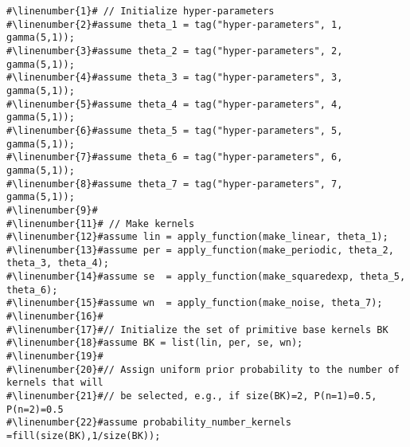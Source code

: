 \begin{mdframed}
\begin{minipage}{\linewidth}
\small
\belowcaptionskip=-10pt
\begin{lstlisting}[mathescape,label=alg:base_kernels,basicstyle=\selectfont\ttfamily,numbers=none,caption={Initialize
Base Kernels BK and $P(n)$},escapechar=\#]
#\linenumber{1}# // Initialize hyper-parameters
#\linenumber{2}#assume theta_1 = tag("hyper-parameters", 1, gamma(5,1));
#\linenumber{3}#assume theta_2 = tag("hyper-parameters", 2, gamma(5,1));
#\linenumber{4}#assume theta_3 = tag("hyper-parameters", 3, gamma(5,1));
#\linenumber{5}#assume theta_4 = tag("hyper-parameters", 4, gamma(5,1));
#\linenumber{6}#assume theta_5 = tag("hyper-parameters", 5, gamma(5,1));
#\linenumber{7}#assume theta_6 = tag("hyper-parameters", 6, gamma(5,1));
#\linenumber{8}#assume theta_7 = tag("hyper-parameters", 7, gamma(5,1));
#\linenumber{9}#
#\linenumber{11}# // Make kernels
#\linenumber{12}#assume lin = apply_function(make_linear, theta_1);
#\linenumber{13}#assume per = apply_function(make_periodic, theta_2, theta_3, theta_4);
#\linenumber{14}#assume se  = apply_function(make_squaredexp, theta_5, theta_6);
#\linenumber{15}#assume wn  = apply_function(make_noise, theta_7);
#\linenumber{16}#
#\linenumber{17}#// Initialize the set of primitive base kernels BK 
#\linenumber{18}#assume BK = list(lin, per, se, wn);
#\linenumber{19}#
#\linenumber{20}#// Assign uniform prior probability to the number of kernels that will
#\linenumber{21}#// be selected, e.g., if size(BK)=2, P(n=1)=0.5, P(n=2)=0.5
#\linenumber{22}#assume probability_number_kernels =fill(size(BK),1/size(BK));
\end{lstlisting}
\end{minipage}
\end{mdframed}

